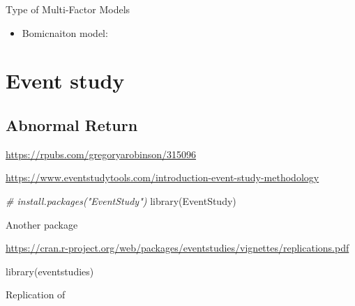 \documentclass[
]{book}
\newenvironment{Shaded}{\begin{snugshade}}{\end{snugshade}}
\newcommand{\CommentTok}[1]{\textcolor[rgb]{0.56,0.35,0.01}{\textit{#1}}}
\newcommand{\FunctionTok}[1]{\textcolor[rgb]{0.00,0.00,0.00}{#1}}
\newcommand{\NormalTok}[1]{#1}
\providecommand{\tightlist}{%
  \setlength{\itemsep}{0pt}\setlength{\parskip}{0pt}}
\begin{document}
Type of Multi-Factor Models

\begin{itemize}
\tightlist
\item
  Bomicnaiton model:
\end{itemize}

\hypertarget{event-study}{%
\section{Event study}\label{event-study}}

\hypertarget{abnormal-return}{%
\subsection{Abnormal Return}\label{abnormal-return}}

\url{https://rpubs.com/gregoryarobinson/315096}

\url{https://www.eventstudytools.com/introduction-event-study-methodology}

\begin{Shaded}
\begin{Highlighting}[]
\CommentTok{\# install.packages("EventStudy")}
\FunctionTok{library}\NormalTok{(EventStudy)}
\end{Highlighting}
\end{Shaded}

Another package

\url{https://cran.r-project.org/web/packages/eventstudies/vignettes/replications.pdf}

\begin{Shaded}
\begin{Highlighting}[]
\FunctionTok{library}\NormalTok{(eventstudies)}
\end{Highlighting}
\end{Shaded}

Replication of \citep{Chen_2004}
\end{document}
